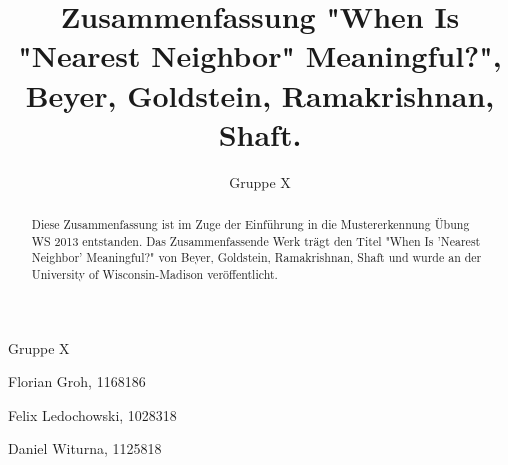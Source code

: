 \documentclass{article}
\begin{document}
\title{Zusammenfassung "When Is "Nearest Neighbor" Meaningful?", Beyer, Goldstein, Ramakrishnan, Shaft.}
\author{Gruppe X}

\maketitle

\begin{abstract}
Diese Zusammenfassung ist im Zuge der Einführung in die Mustererkennung Übung WS 2013 entstanden. Das Zusammenfassende Werk trägt den Titel "When Is 'Nearest Neighbor' Meaningful?" von Beyer, Goldstein, Ramakrishnan, Shaft und wurde an der University of Wisconsin-Madison veröffentlicht. 
\end{abstract}

\vfill

Gruppe X

Florian Groh, 1168186

Felix Ledochowski, 1028318

Daniel Witurna, 1125818

\pagebreak
\end{document}
